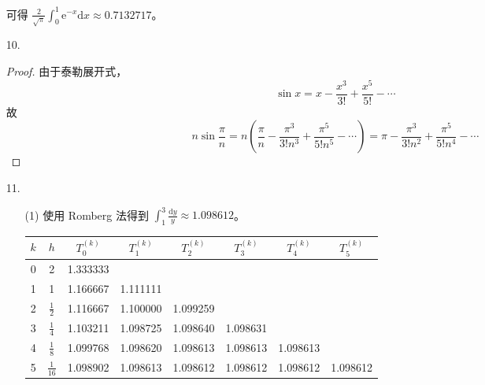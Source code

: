 \documentclass{sjtuarticle}
\def\dd{\mathrm{d}}
\def\ee{\mathrm{e}}
\begin{document}
\begin{itemize}
\begin{solution}
\begin{center}
\begin{tabular}{cccccc}
            \bottomrule
        \end{tabular}
        \end{center}
        可得 $\frac{2}{\sqrt{\pi}}\int_0^1 \ee^{-x}\dd x\approx 0.7132717$。
    \end{solution}
    \item[10.] \begin{proof}
        由于泰勒展开式，
        \begin{equation*}
            \sin x=x-\frac{x^3}{3!}+\frac{x^5}{5!}-\cdots
        \end{equation*}
        故
        \begin{equation*}
            n\sin\frac{\pi}{n}=n(\frac{\pi}{n}-\frac{\pi^3}{3!n^3}+\frac{\pi^5}{5!n^5}-\cdots)=\pi-\frac{\pi^3}{3!n^2}+\frac{\pi^5}{5!n^4}-\cdots
        \end{equation*}
    \end{proof}
    \item[11.] \begin{solution}
        \begin{itemize}
            \item[(1)] 使用 Romberg 法得到 $\int_1^3 \frac{\dd y}{y}\approx 1.098612$。
            \begin{center}
            \begin{tabular}{cccccccc}
            \toprule
            $k$ & $h$ & $T_0^{(k)}$ & $T_1^{(k)}$ & $T_2^{(k)}$ &  $T_3^{(k)}$ & $T_4^{(k)}$ & $T_5^{(k)}$ \\
            \midrule
            0  & 2	& 1.333333 \\
            1  & 1  & 1.166667&	1.111111	\\
            2 &	$\frac12$    &  1.116667	&1.100000 &	1.099259	 \\
            3 &	$\frac14$    & 1.103211 &	1.098725	& 1.098640 &	1.098631	\\
            4 &	$\frac18$    & 1.099768	& 1.098620	& 1.098613	& 1.098613	& 1.098613 \\	
            5 &	$\frac1{16}$ &     1.098902	& 1.098613	& 1.098612	& 1.098612	& 1.098612	& 1.098612 \\
            \bottomrule
            \end{tabular}
            \end{center}
        \end{itemize}
    \end{solution}
\end{itemize}
\end{document}
